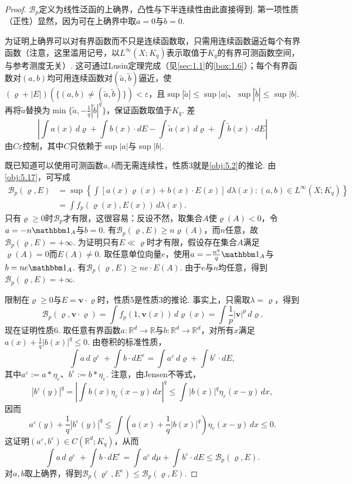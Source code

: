 \begin{proof}
$\mathscr B_p$定义为线性泛函的上确界，凸性与下半连续性由此直接得到. 第一项性质（正性）显然，因为可在上确界中取$a=0$与$b=0$.

为证明上确界可以对有界函数而不只是连续函数取，只需用连续函数逼近每个有界函数（注意，这里滥用记号，以$L^\infty(X;K_q)$表示取值于$K_q$的有界可测函数空间，与参考测度无关）. 这可通过Lusin定理完成（见\autoref{sec:1.1}的\autoref{box:1.6}）；每个有界函数对$(a,b)$均可用连续函数对$(\widetilde a,\widetilde b)$逼近，使
$(\varrho+|E|)(\{(a,b)\ne(\widetilde a,\widetilde b)\})<\varepsilon$，且$\sup|\widetilde a|\le\sup|a|$、$\sup|\widetilde b|\le\sup|b|$. 再将$\widetilde a$替换为$\min\{\widetilde a,-\frac1q|\widetilde b|^q\}$，保证函数取值于$K_q$. 差
\[
\left|\int a(x)\,d\varrho+\int b(x)\cdot dE
-\int\widetilde a(x)\,d\varrho+\int\widetilde b(x)\cdot dE\right|
\]
由$C\varepsilon$控制，其中$C$只依赖于$\sup|a|$与$\sup|b|$.

既已知道可以使用可测函数$a,b$而无需连续性，性质3就是\autoref{obj:5.2}的推论. 由\autoref{obj:5.17}，可写成
\[
\begin{aligned}
\mathscr B_p(\varrho,E)
&=\sup\left\{\int[a(x)\varrho(x)+b(x)\cdot E(x)]\,d\lambda(x):(a,b)\in L^\infty(X;K_q)\right\}\\
&=\int f_p(\varrho(x),E(x))\,d\lambda(x).
\end{aligned}
\]
只有$\varrho\ge0$时$\mathscr B_p$才有限，这很容易：反设不然，取集合$A$使$\varrho(A)<0$，令$a=-n\mathbbm1_A$与$b=0$. 有$\mathscr B_p(\varrho,E)\ge n\varrho(A)$，而$n$任意，故$\mathscr B_p(\varrho,E)=+\infty$. 为证明只有$E\ll\varrho$时才有限，假设存在集合$A$满足$\varrho(A)=0$而$E(A)\ne0$. 取任意单位向量$e$，使用$a=-\frac{n^q}{q}\mathbbm1_A$与$b=ne\mathbbm1_A$. 有$\mathscr B_p(\varrho,E)\ge ne\cdot E(A)$. 由于$e$与$n$均任意，得到$\mathscr B_p(\varrho,E)=+\infty$.

限制在$\varrho\ge0$与$E=\mathbf v\cdot\varrho$时，性质5是性质3的推论. 事实上，只需取$\lambda=\varrho$，得到
\[
\mathscr B_p(\varrho,\mathbf v\cdot\varrho)
=\int f_p(1,\mathbf v(x))\,d\varrho(x)=\int\frac1p|\mathbf v|^p\,d\varrho.
\]
现在证明性质6. 取任意有界函数$a:\mathbb R^d\to\mathbb R$与$b:\mathbb R^d\to\mathbb R^d$，对所有$x$满足$a(x)+\frac1q|b(x)|^q\le0$. 由卷积的标准性质，
\[
\int a\,d\varrho^\varepsilon+\int b\cdot dE^\varepsilon
=\int a^\varepsilon\,d\varrho+\int b^\varepsilon\cdot dE,
\]
其中$a^\varepsilon:=a*\eta_\varepsilon$、$b^\varepsilon:=b*\eta_\varepsilon$. 注意，由Jensen不等式，
\[
|b^\varepsilon(y)|^q
=\left|\int b(x)\eta_\varepsilon(x-y)\,dx\right|^q
\le\int|b(x)|^q\eta_\varepsilon(x-y)\,dx,
\]
因而
\[
a^\varepsilon(y)+\frac1q|b^\varepsilon(y)|^q
\le\int\left(a(x)+\frac1q|b(x)|^q\right)\eta_\varepsilon(x-y)\,dx\le0.
\]
这证明$(a^\varepsilon,b^\varepsilon)\in C(\mathbb R^d;K_q)$，从而
\[
\int a\,d\varrho^\varepsilon+\int b\cdot dE^\varepsilon
=\int a^\varepsilon\,d\mu+\int b^\varepsilon\cdot dE\le\mathscr B_p(\varrho,E).
\]
对$a,b$取上确界，得到$\mathscr B_p(\varrho^\varepsilon,E^\varepsilon)\le\mathscr B_p(\varrho,E)$.
\end{proof}

